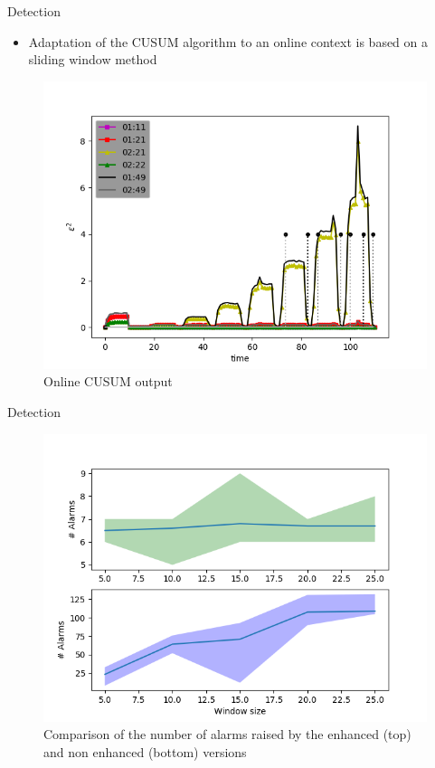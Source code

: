 \documentclass[aspectratio=43]{beamer}
\begin{document}
\begin{frame}{Detection}
    \begin{itemize}
        \item Adaptation of the CUSUM algorithm to an online context is based on a sliding window
            method 
    \end{itemize}

    \begin{figure}
        \includegraphics[width=.6\textwidth]{meter_eleph/detection_results_plotted}
        \caption{Online CUSUM output}
    \end{figure}
\end{frame}

\begin{frame}{Detection}
    \begin{figure}
        \includegraphics[width=.7\textwidth]{meter_eleph/evaluation_error}
        \caption{Comparison of the number of alarms raised by the enhanced (top) and non enhanced (bottom) versions}
    \end{figure}
\end{frame}
\end{document}
